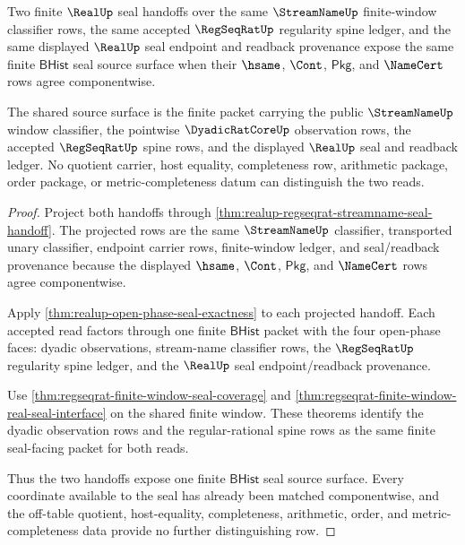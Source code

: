 \begin{theorem}
\label{thm:realup-finite-seal-source-uniqueness}
Two finite $\RealUp$ seal handoffs over the same $\StreamNameUp$
finite-window classifier rows, the same accepted $\RegSeqRatUp$ regularity
spine ledger, and the same displayed $\RealUp$ seal endpoint and readback
provenance expose the same finite $\mathsf{BHist}$ seal source surface when
their $\hsame$, $\Cont$, $\mathsf{Pkg}$, and $\NameCert$ rows agree
componentwise.

The shared source surface is the finite packet carrying the public
$\StreamNameUp$ window classifier, the pointwise $\DyadicRatCoreUp$
observation rows, the accepted $\RegSeqRatUp$ spine rows, and the displayed
$\RealUp$ seal and readback ledger. No quotient carrier, host equality,
completeness row, arithmetic package, order package, or metric-completeness
datum can distinguish the two reads.
\end{theorem}
\begin{proof}
Project both handoffs through
\autoref{thm:realup-regseqrat-streamname-seal-handoff}. The projected rows are
the same $\StreamNameUp$ classifier, transported unary classifier, endpoint
carrier rows, finite-window ledger, and seal/readback provenance because the
displayed $\hsame$, $\Cont$, $\mathsf{Pkg}$, and $\NameCert$ rows agree
componentwise.

Apply \autoref{thm:realup-open-phase-seal-exactness} to each projected
handoff. Each accepted read factors through one finite $\mathsf{BHist}$ packet
with the four open-phase faces: dyadic observations, stream-name classifier
rows, the $\RegSeqRatUp$ regularity spine ledger, and the $\RealUp$ seal
endpoint/readback provenance.

Use \autoref{thm:regseqrat-finite-window-seal-coverage} and
\autoref{thm:regseqrat-finite-window-real-seal-interface} on the shared
finite window. These theorems identify the dyadic observation rows and the
regular-rational spine rows as the same finite seal-facing packet for both
reads.

Thus the two handoffs expose one finite $\mathsf{BHist}$ seal source surface.
Every coordinate available to the seal has already been matched
componentwise, and the off-table quotient, host-equality, completeness,
arithmetic, order, and metric-completeness data provide no further
distinguishing row.
\end{proof}

